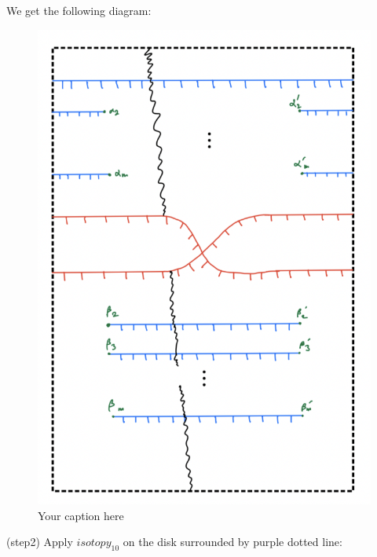 We get the following diagram:

\begin{figure}[H] %
    \centering
    \includegraphics[scale=0.95]{diagrams/lemma11/4.png} %
    \caption{Your caption here}
    \label{fig:your-label}
\end{figure}

(step2) Apply $isotopy_{10}$ on the disk surrounded by purple dotted line:

